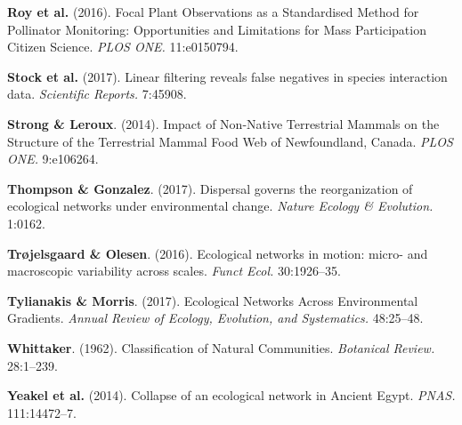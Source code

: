 \leavevmode\hypertarget{ref-RoyBaxt16}{}%
\textbf{Roy et al.} (2016). Focal Plant Observations as a Standardised
Method for Pollinator Monitoring: Opportunities and Limitations for Mass
Participation Citizen Science. \emph{PLOS ONE.} 11:e0150794.

\leavevmode\hypertarget{ref-StocPois17}{}%
\textbf{Stock et al.} (2017). Linear filtering reveals false negatives
in species interaction data. \emph{Scientific Reports.} 7:45908.

\leavevmode\hypertarget{ref-StroLero14}{}%
\textbf{Strong \& Leroux}. (2014). Impact of Non-Native Terrestrial
Mammals on the Structure of the Terrestrial Mammal Food Web of
Newfoundland, Canada. \emph{PLOS ONE.} 9:e106264.

\leavevmode\hypertarget{ref-ThomGonz17}{}%
\textbf{Thompson \& Gonzalez}. (2017). Dispersal governs the
reorganization of ecological networks under environmental change.
\emph{Nature Ecology \& Evolution.} 1:0162.

\leavevmode\hypertarget{ref-TrojOles16}{}%
\textbf{Trøjelsgaard \& Olesen}. (2016). Ecological networks in motion:
micro- and macroscopic variability across scales. \emph{Funct Ecol.}
30:1926--35.

\leavevmode\hypertarget{ref-TyliMorr17}{}%
\textbf{Tylianakis \& Morris}. (2017). Ecological Networks Across
Environmental Gradients. \emph{Annual Review of Ecology, Evolution, and
Systematics.} 48:25--48.

\leavevmode\hypertarget{ref-Whit62}{}%
\textbf{Whittaker}. (1962). Classification of Natural Communities.
\emph{Botanical Review.} 28:1--239.

\leavevmode\hypertarget{ref-YeakPire14}{}%
\textbf{Yeakel et al.} (2014). Collapse of an ecological network in
Ancient Egypt. \emph{PNAS.} 111:14472--7. 
